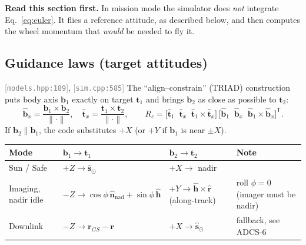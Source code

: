 \documentclass[11pt,a4paper]{article}
\newcommand{\vb}[1]{\boldsymbol{#1}}
\newcommand{\uv}[1]{\hat{\boldsymbol{#1}}}
\newcommand{\src}[1]{\textcolor{gray}{\small[\texttt{#1}]}}
\newcommand{\tp}{^{\mathsf{T}}}
\begin{document}
\textbf{Read this section first.} In mission mode the simulator does \emph{not} integrate Eq.~\eqref{eq:euler}. It flies a reference attitude, as described below, and then computes the wheel momentum that \emph{would} be needed to fly it.

\subsection{Guidance laws (target attitudes)} \src{models.hpp:189}, \src{sim.cpp:585}
The ``align--constrain'' (TRIAD) construction puts body axis $\vb b_1$ exactly on target $\vb t_1$ and brings $\vb b_2$ as close as possible to $\vb t_2$:
\begin{equation}
\uv b_x = \frac{\vb b_1\times\vb b_2}{\lVert\cdot\rVert},\quad
\uv t_x = \frac{\vb t_1\times\vb t_2}{\lVert\cdot\rVert},\qquad
R_c = \big[\uv t_1\;\; \uv t_x\;\; \uv t_1\times\uv t_x\big]\,\big[\uv b_1\;\; \uv b_x\;\; \uv b_1\times\uv b_x\big]\tp .
\end{equation}
If $\vb b_2 \parallel \vb b_1$, the code substitutes $+X$ (or $+Y$ if $\vb b_1$ is near $\pm X$).
\begin{center}
\begin{tabular}{@{}llll@{}}
\toprule
Mode & $\vb b_1 \to \vb t_1$ & $\vb b_2 \to \vb t_2$ & Note\\
\midrule
Sun / Safe & $+Z\to\uv s_\odot$ & $+X\to$ nadir & \\
Imaging, nadir idle & $-Z\to\cos\phi\,\uv n_{\text{nad}} + \sin\phi\,\uv h$ & $+Y\to\uv h\times\uv r$ (along-track) & roll $\phi = 0$ (imager must be nadir)\\
Downlink & $-Z\to\vb r_{GS} - \vb r$ & $+X\to\uv s_\odot$ & fallback, see ADCS-6\\
\bottomrule
\end{tabular}
\end{center}
\end{document}
